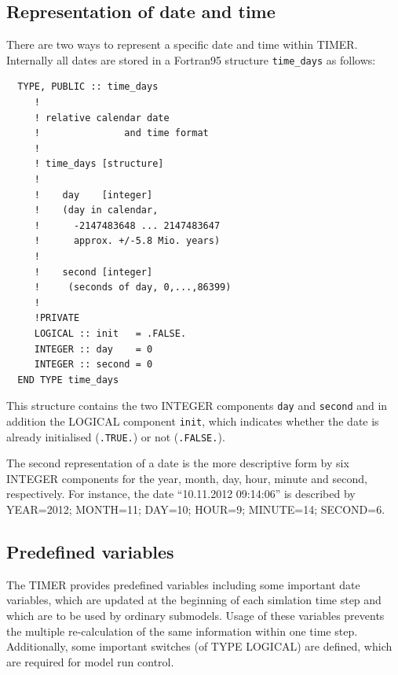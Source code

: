 \documentclass[twoside]{article}
\begin{document}
\subsection{Representation of date and time}
\label{sec:types}
There are two ways to represent a specific date and time within TIMER. 
%
Internally all dates are stored in a Fortran95 structure \verb|time_days| as
follows:
%
\begin{verbatim}
  TYPE, PUBLIC :: time_days 
     !
     ! relative calendar date 
     !               and time format
     !
     ! time_days [structure]
     !
     !    day    [integer] 
     !    (day in calendar,
     !      -2147483648 ... 2147483647
     !      approx. +/-5.8 Mio. years)
     !
     !    second [integer]  
     !     (seconds of day, 0,...,86399)
     !
     !PRIVATE
     LOGICAL :: init   = .FALSE.
     INTEGER :: day    = 0
     INTEGER :: second = 0
  END TYPE time_days
\end{verbatim}
%
This structure contains the two {\footnotesize INTEGER} components \verb|day| and
\verb|second| and in addition the {\footnotesize LOGICAL} component 
\verb|init|, which
indicates whether the date is already initialised (\verb|.TRUE.|) or
not (\verb|.FALSE.|).

The second representation of a date is the more descriptive form by
six {\footnotesize INTEGER} components for the year, month, day, hour,
minute and second,
respectively. For instance, the date ``10.11.2012 09:14:06'' 
is described by
YEAR=2012; MONTH=11; DAY=10; HOUR=9; MINUTE=14; SECOND=6.


\subsection{Predefined variables}
\label{sec:predef}
The TIMER provides predefined variables including some important date
variables, which are updated at the beginning of each simlation time step and
which are to be used by ordinary submodels. Usage of these variables prevents
the multiple re-calculation of the same information within one time step.
Additionally, some important switches (of {\footnotesize TYPE} {\footnotesize LOGICAL}) are
 defined, which are required for model run control.

\end{document}
